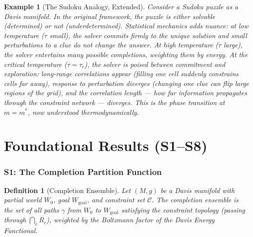 \documentclass[11pt,letterpaper]{article}
\newtheorem{definition}[conjecture]{Definition}
\newtheorem{example}[conjecture]{Example}
\begin{document}
\begin{example}[The Sudoku Analogy, Extended]
Consider a Sudoku puzzle as a Davis manifold. In the original framework, 
the puzzle is either solvable (determined) or not (underdetermined). 
Statistical mechanics adds nuance: at low temperature ($\tau$ small), 
the solver commits firmly to the unique solution and small perturbations 
to a clue do not change the answer. At high temperature ($\tau$ large), 
the solver entertains many possible completions, weighting them by energy. 
At the critical temperature ($\tau = \tau_c$), the solver is poised between 
commitment and exploration: long-range correlations appear (filling one 
cell suddenly constrains cells far away), response to perturbation diverges 
(changing one clue can flip large regions of the grid), and the 
correlation length --- how far information propagates through the 
constraint network --- diverges. This is the phase transition at $m = m^*$, 
now understood thermodynamically.
\end{example}

\newpage
\part{Foundational Results (S1--S8)}

\section{S1: The Completion Partition Function}

\begin{definition}[Completion Ensemble]
Let $(M, g)$ be a Davis manifold with partial world $W_0$, goal $W_{\mathrm{goal}}$, 
and constraint set $\mathcal{C}$. The \emph{completion ensemble} is the set 
of all paths $\gamma$ from $W_0$ to $W_{\mathrm{goal}}$ satisfying the 
constraint topology (passing through $\bigcap_c R_c$), weighted by the 
Boltzmann factor of the Davis Energy Functional.
\end{definition}
\end{document}
